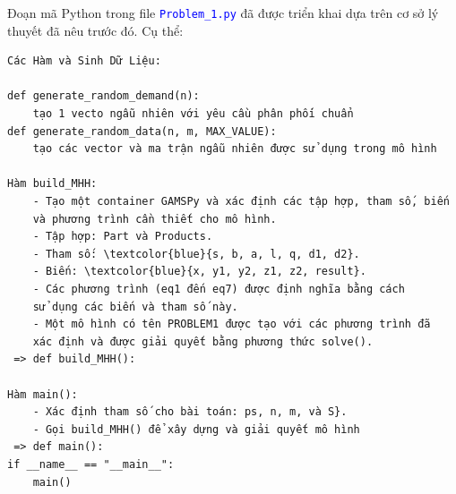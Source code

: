 \documentclass[a4paper]{article}
\begin{document}
Đoạn mã Python trong file \textcolor{blue}{\texttt{Problem\_1.py}} đã được triển khai dựa trên cơ sở lý thuyết đã nêu trước đó. Cụ thể:

\begin{verbatim}
Các Hàm và Sinh Dữ Liệu:

def generate_random_demand(n): 
    tạo 1 vecto ngẫu nhiên với yêu cầu phân phối chuẩn 
def generate_random_data(n, m, MAX_VALUE): 
    tạo các vector và ma trận ngẫu nhiên được sử dụng trong mô hình 

Hàm build_MHH:
    - Tạo một container GAMSPy và xác định các tập hợp, tham số, biến 
    và phương trình cần thiết cho mô hình.
    - Tập hợp: Part và Products.
    - Tham số: \textcolor{blue}{s, b, a, l, q, d1, d2}.
    - Biến: \textcolor{blue}{x, y1, y2, z1, z2, result}.
    - Các phương trình (eq1 đến eq7) được định nghĩa bằng cách 
    sử dụng các biến và tham số này.
    - Một mô hình có tên PROBLEM1 được tạo với các phương trình đã 
    xác định và được giải quyết bằng phương thức solve().
 => def build_MHH():

Hàm main():
    - Xác định tham số cho bài toán: ps, n, m, và S}.
    - Gọi build_MHH() để xây dựng và giải quyết mô hình
 => def main():
if __name__ == "__main__":
    main()
\end{verbatim}


\end{document}
